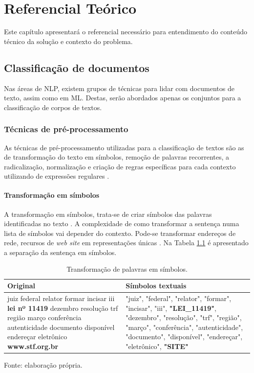 \chapter[Referêncial Teórico]{Referencial Teórico}

Este capítulo apresentará o referencial necessário para entendimento do conteúdo técnico da solução e contexto do problema.

\section{Classificação de documentos}

Nas áreas de NLP, existem grupos de técnicas para lidar com documentos de texto, assim como em ML. Destas, serão abordados apenas os conjuntos para a classificação de corpos de textos.

\subsection{Técnicas de pré-processamento}
As técnicas de pré-processamento utilizadas para a classificação de textos são as de transformação do texto em símbolos, remoção de palavras recorrentes, a radicalização, normalização e criação de regras específicas para cada contexto utilizando de expressões regulares \cite{oliveira_automatic_2017}.

\subsubsection{Transformação em símbolos}

A transformação em símbolos, trata-se de criar símbolos das palavras identificadas no texto \cite{manning_introduction_2008}.
A complexidade de como transformar a sentença numa lista de símbolos vai depender do contexto. Pode-se transformar endereços de rede, recursos de \textit{web site} em representações únicas \cite{manning_introduction_2008}. Na Tabela \ref{tab:palavrasSimbolos} é apresentado a separação da sentença em símbolos.

\begin{table}[ht]
	\centering    
	\caption[Transformação de palavras em símbolos]{Transformação de palavras em símbolos.}
    \label{tab:palavrasSimbolos}
	\begin{tabular}{|p{7cm}|p{7cm}|}
    \hline
    \textbf{Original} & \textbf{Símbolos textuais}\\ \hline
	juiz federal relator formar incisar iii \textbf{lei nº 11419} dezembro resolução trf região março conferência autenticidade documento disponível endereçar eletrônico \textbf{www.stf.org.br} & "juiz", "federal", "relator", "formar", "incisar", "iii", \textbf{"LEI\_11419"}, "dezembro", "resolução", "trf", "região", "março", "conferência", "autenticidade", "documento", "disponível", "endereçar", "eletrônico", \textbf{"SITE"}
    \\ \hline
    \end{tabular}\par Fonte: elaboração própria.
\end{table}

